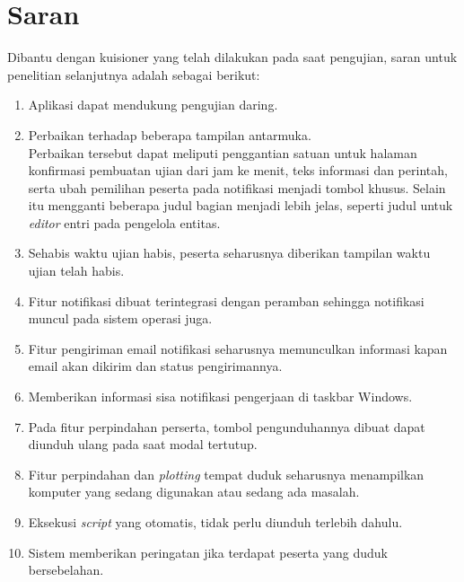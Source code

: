 \section{Saran}
    Dibantu dengan kuisioner yang telah dilakukan pada saat pengujian, saran untuk penelitian selanjutnya adalah
    sebagai berikut:
    \begin{enumerate}
        \item Aplikasi dapat mendukung pengujian daring.
        \item Perbaikan terhadap beberapa tampilan antarmuka. \\
            Perbaikan tersebut dapat meliputi penggantian satuan untuk halaman konfirmasi pembuatan ujian dari jam
            ke menit, teks informasi dan perintah, serta ubah pemilihan peserta pada notifikasi menjadi tombol khusus.
            Selain itu mengganti beberapa judul bagian menjadi lebih jelas, seperti judul untuk \textit{editor}
            entri pada pengelola entitas.
        \item Sehabis waktu ujian habis, peserta seharusnya diberikan tampilan waktu ujian telah habis.
        \item Fitur notifikasi dibuat terintegrasi dengan peramban sehingga notifikasi muncul pada 
            sistem operasi juga.
        \item Fitur pengiriman email notifikasi seharusnya memunculkan informasi kapan email akan
            dikirim dan status pengirimannya.
        \item Memberikan informasi sisa notifikasi pengerjaan di taskbar Windows.
        \item Pada fitur perpindahan perserta, tombol pengunduhannya dibuat dapat diunduh ulang pada
            saat modal tertutup.
        \item Fitur perpindahan dan \textit{plotting} tempat duduk seharusnya menampilkan komputer
            yang sedang digunakan atau sedang ada masalah.
        \item Eksekusi \textit{script} yang otomatis, tidak perlu diunduh terlebih dahulu.
        \item Sistem memberikan peringatan jika terdapat peserta yang duduk bersebelahan.
    \end{enumerate}